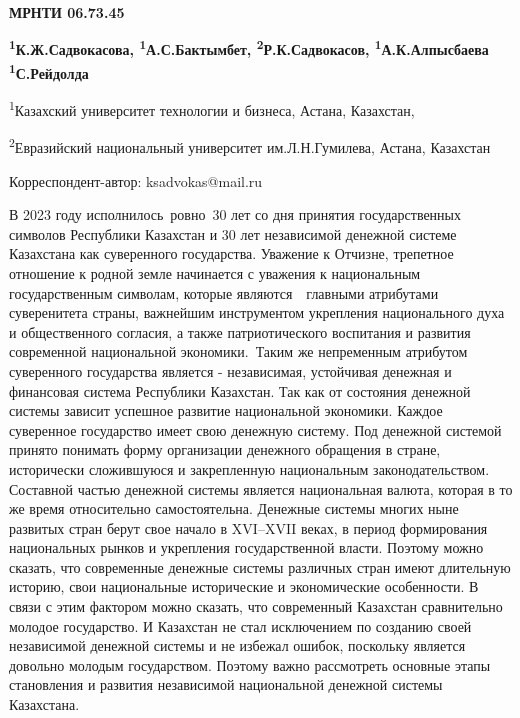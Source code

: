 \newpage
{\bfseries МРНТИ 06.73.45}


\begin{center}
{\bfseries \textsuperscript{1}К.Ж.Садвокасова, \textsuperscript{1}А.С.Бактымбет, \textsuperscript{2}Р.К.Садвокасов, \textsuperscript{1}А.К.Алпысбаева \textsuperscript{1}С.Рейдолда}

\textsuperscript{1}Казахский университет технологии и бизнеса, Астана,
Казахстан,

\textsuperscript{2}Евразийский национальный университет им.Л.Н.Гумилева,
Астана, Казахстан

Корреспондент-автор: ksadvokas@mail.ru
\end{center}

В 2023 году исполнилось~ровно~30 лет со дня принятия государственных
символов Республики Казахстан и 30 лет независимой денежной системе
Казахстана как суверенного государства. Уважение к Отчизне, трепетное
отношение к родной земле начинается с уважения к национальным
государственным символам, которые являются~~главными атрибутами
суверенитета страны, важнейшим инструментом укрепления национального
духа и общественного согласия, а также патриотического воспитания и
развития современной национальной экономики.~Таким же непременным
атрибутом суверенного государства является - независимая, устойчивая
денежная и финансовая система Республики Казахстан. Так как от состояния
денежной системы зависит успешное развитие национальной экономики.
Каждое суверенное государство имеет свою денежную систему. Под денежной
системой принято понимать форму организации денежного обращения в
стране, исторически сложившуюся и закрепленную национальным
законодательством. Составной частью денежной системы является
национальная валюта, которая в то же время относительно самостоятельна.
Денежные системы многих ныне развитых стран берут свое начало в
XVI--XVII веках, в период формирования национальных рынков и укрепления
государственной власти. Поэтому можно сказать, что современные денежные
системы различных стран имеют длительную историю, свои национальные
исторические и экономические особенности. В связи с этим фактором можно
сказать, что современный Казахстан сравнительно молодое государство. И
Казахстан не стал исключением по созданию своей независимой денежной
системы и не избежал ошибок, поскольку является довольно молодым
государством. Поэтому важно рассмотреть основные этапы становления и
развития независимой национальной денежной системы Казахстана.

